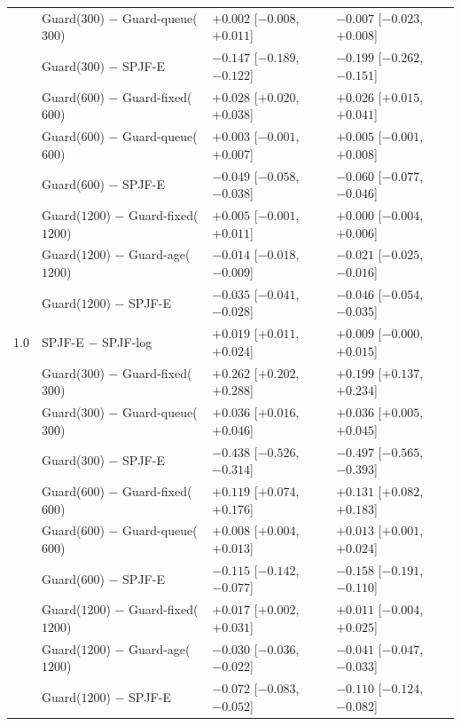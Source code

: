 \documentclass[mathematics,supfile,submit,moreauthors]{Definitions/mdpi}
\newcommand{\devnum}[1]{#1}
\begin{document}
\begin{table}[htbp]
\begin{tabular}{llll}
 & Guard($\devnum{300}$) $-$ Guard-queue($\devnum{300}$) & \devnum{$+0.002$ [$-0.008$, $+0.011$]} & \devnum{$-0.007$ [$-0.023$, $+0.008$]} \\
 & Guard($\devnum{300}$) $-$ SPJF-E & \devnum{$-0.147$ [$-0.189$, $-0.122$]} & \devnum{$-0.199$ [$-0.262$, $-0.151$]} \\
 & Guard($\devnum{600}$) $-$ Guard-fixed($\devnum{600}$) & \devnum{$+0.028$ [$+0.020$, $+0.038$]} & \devnum{$+0.026$ [$+0.015$, $+0.041$]} \\
 & Guard($\devnum{600}$) $-$ Guard-queue($\devnum{600}$) & \devnum{$+0.003$ [$-0.001$, $+0.007$]} & \devnum{$+0.005$ [$-0.001$, $+0.008$]} \\
 & Guard($\devnum{600}$) $-$ SPJF-E & \devnum{$-0.049$ [$-0.058$, $-0.038$]} & \devnum{$-0.060$ [$-0.077$, $-0.046$]} \\
 & Guard($\devnum{1200}$) $-$ Guard-fixed($\devnum{1200}$) & \devnum{$+0.005$ [$-0.001$, $+0.011$]} & \devnum{$+0.000$ [$-0.004$, $+0.006$]} \\
 & Guard($\devnum{1200}$) $-$ Guard-age($\devnum{1200}$) & \devnum{$-0.014$ [$-0.018$, $-0.009$]} & \devnum{$-0.021$ [$-0.025$, $-0.016$]} \\
 & Guard($\devnum{1200}$) $-$ SPJF-E & \devnum{$-0.035$ [$-0.041$, $-0.028$]} & \devnum{$-0.046$ [$-0.054$, $-0.035$]} \\
\midrule
\devnum{1.0} & SPJF-E $-$ SPJF-log & \devnum{$+0.019$ [$+0.011$, $+0.024$]} & \devnum{$+0.009$ [$-0.000$, $+0.015$]} \\
 & Guard($\devnum{300}$) $-$ Guard-fixed($\devnum{300}$) & \devnum{$+0.262$ [$+0.202$, $+0.288$]} & \devnum{$+0.199$ [$+0.137$, $+0.234$]} \\
 & Guard($\devnum{300}$) $-$ Guard-queue($\devnum{300}$) & \devnum{$+0.036$ [$+0.016$, $+0.046$]} & \devnum{$+0.036$ [$+0.005$, $+0.045$]} \\
 & Guard($\devnum{300}$) $-$ SPJF-E & \devnum{$-0.438$ [$-0.526$, $-0.314$]} & \devnum{$-0.497$ [$-0.565$, $-0.393$]} \\
 & Guard($\devnum{600}$) $-$ Guard-fixed($\devnum{600}$) & \devnum{$+0.119$ [$+0.074$, $+0.176$]} & \devnum{$+0.131$ [$+0.082$, $+0.183$]} \\
 & Guard($\devnum{600}$) $-$ Guard-queue($\devnum{600}$) & \devnum{$+0.008$ [$+0.004$, $+0.013$]} & \devnum{$+0.013$ [$+0.001$, $+0.024$]} \\
 & Guard($\devnum{600}$) $-$ SPJF-E & \devnum{$-0.115$ [$-0.142$, $-0.077$]} & \devnum{$-0.158$ [$-0.191$, $-0.110$]} \\
 & Guard($\devnum{1200}$) $-$ Guard-fixed($\devnum{1200}$) & \devnum{$+0.017$ [$+0.002$, $+0.031$]} & \devnum{$+0.011$ [$-0.004$, $+0.025$]} \\
 & Guard($\devnum{1200}$) $-$ Guard-age($\devnum{1200}$) & \devnum{$-0.030$ [$-0.036$, $-0.022$]} & \devnum{$-0.041$ [$-0.047$, $-0.033$]} \\
 & Guard($\devnum{1200}$) $-$ SPJF-E & \devnum{$-0.072$ [$-0.083$, $-0.052$]} & \devnum{$-0.110$ [$-0.124$, $-0.082$]} \\
\bottomrule
\end{tabular}
\end{table}
\end{document}
